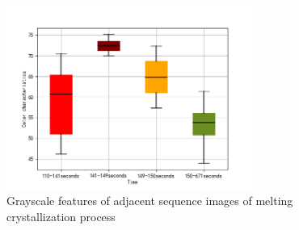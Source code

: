 \documentclass{apmcmthesis}
\begin{document}
		
	

		\begin{figure}[htbp!]
			\centering
			\includegraphics[height=6cm]{./figures/6-2-colorbx.png}
			\caption{Grayscale features of adjacent sequence images of melting crystallization process}
			\label{fig:9}
		\end{figure}
 \newpage
	
\end{document}
